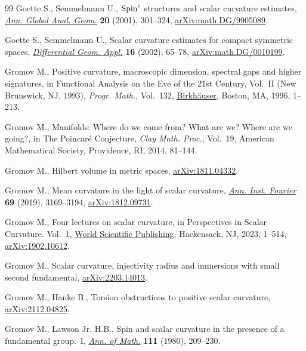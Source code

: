 \documentclass[10pt,a4paper]{amsart}
\numberwithin{equation}{section}
\begin{document}
\begin{thebibliography}{99}
Goette S., Semmelmann U., {${\rm Spin}^c$} structures and scalar curvature
  estimates, \href{https://doi.org/10.1023/A:1013035721335}{\textit{Ann. Global Anal. Geom.}} \textbf{20} (2001), 301--324,
  \href{https://arxiv.org/abs/math.DG/9905089}{arXiv:math.DG/9905089}.

Goette S., Semmelmann U., Scalar curvature estimates for compact symmetric
  spaces, \href{https://doi.org/10.1016/S0926-2245(01)00068-7}{\textit{Differential Geom. Appl.}} \textbf{16} (2002), 65--78,
  \href{https://arxiv.org/abs/math.DG/0010199}{arXiv:math.DG/0010199}.


Gromov M., Positive curvature, macroscopic dimension, spectral gaps and higher
  signatures, in Functional {A}nalysis on the {E}ve of the 21st {C}entury,
  {V}ol.~{II} ({N}ew {B}runswick, {NJ}, 1993), \textit{Progr. Math.}, Vol.~132,
  \href{https://doi.org/10.1007/978-1-4612-4098-3_1}{Birkh\"auser}, Boston, MA, 1996, 1--213.

Gromov M., Manifolds: {W}here do we come from? {W}hat are we? {W}here are we
  going?, in The {P}oincar\'e {C}onjecture, \textit{Clay Math. Proc.}, Vol.~19,
  American Mathematical Society, Providence, RI, 2014, 81--144.

Gromov M., Hilbert volume in metric spaces, \href{https://arxiv.org/abs/1811.04332}{arXiv:1811.04332}.

Gromov M., Mean curvature in the light of scalar curvature, \href{https://doi.org/10.5802/aif.3347}{\textit{Ann. Inst.
  Fourier}} \textbf{69} (2019), 3169--3194, \href{https://arxiv.org/abs/1812.09731}{arXiv:1812.09731}.

Gromov M., Four lectures on scalar curvature, in Perspectives in {S}calar
  {C}urvature. {V}ol.~1, \href{https://doi.org/10.1142/9789811273223_0001}{World Scientific Publishing}, Hackensack, NJ, 2023,
  1--514, \href{https://arxiv.org/abs/1902.10612}{arXiv:1902.10612}.

Gromov M., Scalar curvature, injectivity radius and immersions with small
  second fundamental, \href{https://arxiv.org/abs/2203.14013}{arXiv:2203.14013}.

Gromov M., Hanke B., Torsion obstructions to positive scalar curvature,
  \href{https://arxiv.org/abs/2112.04825}{arXiv:2112.04825}.

Gromov M., Lawson Jr. H.B., Spin and scalar curvature in the presence of a
  fundamental group.~{I}, \href{https://doi.org/10.2307/1971198}{\textit{Ann. of Math.}} \textbf{111} (1980), 209--230.


\end{thebibliography}
\end{document}

